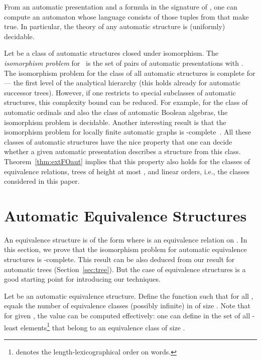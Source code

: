 \documentclass[envcountsame]{llncs}
\begin{document}
\begin{theorem}\label{thm:extFOaut} 
  From an automatic presentation  and a formula  in the signature of
  , one can compute an automaton whose language consists of
  those tuples  from  that make  true. In
  particular, the  theory of any
  automatic structure  is (uniformly) decidable. 
\end{theorem}
Let  be a class of automatic structures closed under
isomorphism. The {\em isomorphism problem} for~ is the set of
pairs  of automatic presentations with
. The isomorphism problem for the class 
of all automatic structures is complete for  --- the first level
of the analytical hierarchy \cite{KhoNRS07} (this holds already for
automatic successor trees). However, if one restricts to special subclasses of
automatic structures, this complexity bound can be reduced. For
example, for the class of automatic ordinals and also the class of
automatic Boolean algebras, the isomorphism problem is decidable.
Another interesting result is that the isomorphism problem for locally
finite automatic graphs is -complete~\cite{Rub04}.
All these classes of
automatic structures have the nice property that one can decide
whether a given automatic presentation describes a structure from
this class. Theorem~\ref{thm:extFOaut} implies that this property
also holds for the classes of equivalence relations, trees of
height at most , and linear orders, i.e., the classes considered
in this paper.


\section{Automatic Equivalence Structures}\label{sec:equiv}

An equivalence structure is of the form  where  is an
equivalence relation on .
In this section, we prove that the isomorphism problem for automatic
equivalence structures is -complete. This result can
be also deduced from our result for automatic trees (Section~\ref{sec:tree}).
But the case of equivalence structures is a good starting point for
introducing our techniques.

Let  be an automatic equivalence structure. Define the function
 such that
for all ,  equals the number of
equivalence classes (possibly infinite) in  of size . Note
that for given , the value  can be
computed effectively: one can define in  the set
of all -least elements\footnote{ denotes the
  length-lexicographical order on words.} that belong to an
equivalence class of size .
\end{document}
